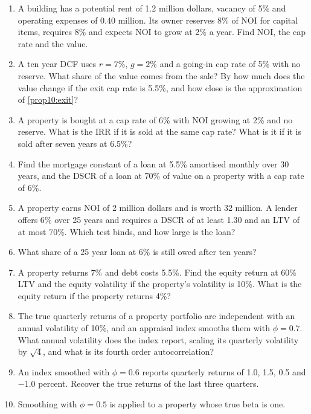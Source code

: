 \begin{chapterrefs}
\begin{enumerate}[label=\textbf{10.\arabic*}, ref=10.\arabic*, leftmargin=*]
  \item\label{exr10:one} A building has a potential rent of 1.2 million dollars, vacancy of 5\% and
  operating expenses of 0.40 million. Its owner reserves 8\% of NOI for capital items, requires 8\% and
  expects NOI to grow at 2\% a year. Find NOI, the cap rate and the value.
  \item\label{exr10:two} A ten year DCF uses $r=7\%$, $g=2\%$ and a going-in cap rate of 5\% with no
  reserve. What share of the value comes from the sale? By how much does the value change if the exit cap
  rate is 5.5\%, and how close is the approximation of \cref{prop10:exit}?
  \item\label{exr10:three} A property is bought at a cap rate of 6\% with NOI growing at 2\% and no
  reserve. What is the IRR if it is sold at the same cap rate? What is it if it is sold after seven years at
  6.5\%?
  \item\label{exr10:four} Find the mortgage constant of a loan at 5.5\% amortised monthly over 30 years,
  and the DSCR of a loan at 70\% of value on a property with a cap rate of 6\%.
  \item\label{exr10:five} A property earns NOI of 2 million dollars and is worth 32 million. A lender
  offers 6\% over 25 years and requires a DSCR of at least 1.30 and an LTV of at most 70\%. Which test
  binds, and how large is the loan?
  \item\label{exr10:six} What share of a 25 year loan at 6\% is still owed after ten years?
  \item\label{exr10:seven} A property returns 7\% and debt costs 5.5\%. Find the equity return at 60\%
  LTV and the equity volatility if the property's volatility is 10\%. What is the equity return if the
  property returns 4\%?
  \item\label{exr10:eight} The true quarterly returns of a property portfolio are independent with an
  annual volatility of 10\%, and an appraisal index smooths them with $\phi=0.7$. What annual volatility
  does the index report, scaling its quarterly volatility by $\sqrt4$, and what is its fourth order
  autocorrelation?
  \item\label{exr10:nine} An index smoothed with $\phi=0.6$ reports quarterly returns of 1.0, 1.5, 0.5
  and $-1.0$ percent. Recover the true returns of the last three quarters.
  \item\label{exr10:ten} Smoothing with $\phi=0.5$ is applied to a property whose true beta is one.

\end{enumerate}
\end{chapterrefs}
